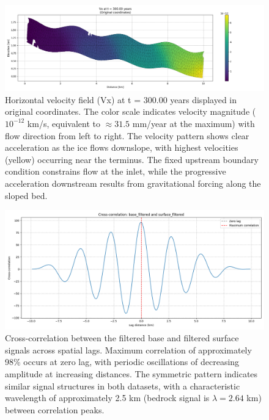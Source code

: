 \begin{figure}
    \includegraphics[scale=0.45]{Vx_300yrs_xz.png}
    \caption{Horizontal velocity field (Vx) at t = 300.00 years displayed in original coordinates. The color scale indicates velocity magnitude ($10^{-12}$ km/s, equivalent to $\approx 31.5$ mm/year at the maximum) with flow direction from left to right. The velocity pattern shows clear acceleration as the ice flows downslope, with highest velocities (yellow) occurring near the terminus. The fixed upstream boundary condition  constrains flow at the inlet, while the progressive acceleration downstream results from gravitational forcing along the sloped bed.}
    \label{fig:Vx}
\end{figure}

\begin{figure}
    \includegraphics[scale=0.5]{xcorr_filtered.png}
    \caption{Cross-correlation between the filtered base and filtered surface signals across spatial lags. Maximum correlation of approximately 98\% occurs at zero lag, with periodic oscillations of decreasing amplitude at increasing distances. The symmetric pattern indicates similar signal structures in both datasets, with a characteristic wavelength of approximately 2.5 km (bedrock signal is $\lambda = 2.64$ km) between correlation peaks.}
    \label{fig:xcorr_filtered}
\end{figure}

